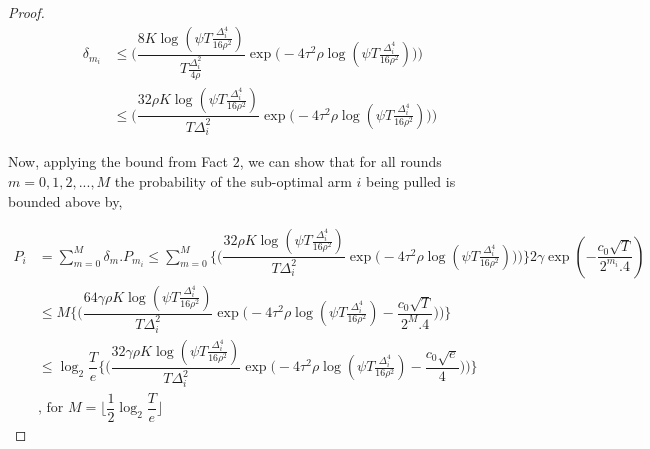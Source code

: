 \begin{proof}
\begin{align*}
\delta_{m_{i}}& \leq \bigg(\dfrac{8K\log (\psi T \frac{\Delta_{i}^{4}}{16\rho^{2}})}{T\frac{\Delta_{i}^{2}}{4\rho}}\exp\big(-4\tau^{2}\rho\log (\psi T\frac{\Delta_{i}^{4}}{16\rho^{2}})\big)\bigg)\\
&\leq \bigg(\dfrac{32\rho K\log (\psi T \frac{\Delta_{i}^{4}}{16\rho^{2}})}{T\Delta_{i}^{2}}\exp\big(-4\tau^{2}\rho\log (\psi T\frac{\Delta_{i}^{4}}{16\rho^{2}})\big)\bigg)
\end{align*}

%

Now, applying the bound from Fact $2$, we can show that for all rounds $m=0,1,2,...,M$ the probability of the sub-optimal arm $i$ being pulled is bounded above by,

\begin{align*}
P_{i} &= \sum_{m=0}^{M} \delta_{m}.P_{m_{i}} \leq \sum_{m=0}^{M} \bigg\lbrace \bigg(\dfrac{32\rho K\log (\psi T \frac{\Delta_{i}^{4}}{16\rho^{2}})}{T\Delta_{i}^{2}}\exp\big(-4\tau^{2}\rho\log (\psi T\frac{\Delta_{i}^{4}}{16\rho^{2}})\big)\bigg) \bigg\rbrace2\gamma \exp(-\dfrac{c_{0}\sqrt{T}}{2^{m_{i}}.4})\\
& \leq M \bigg\lbrace \bigg(\dfrac{64\gamma\rho K\log (\psi T \frac{\Delta_{i}^{4}}{16\rho^{2}})}{T\Delta_{i}^{2}}\exp\big(-4\tau^{2}\rho\log (\psi T\frac{\Delta_{i}^{4}}{16\rho^{2}})-\dfrac{c_{0}\sqrt{T}}{2^{M}.4}\big)\bigg) \bigg\rbrace \\
& \leq \log_{2}\dfrac{T}{e}\bigg\lbrace \bigg(\dfrac{32\gamma\rho K\log (\psi T \frac{\Delta_{i}^{4}}{16\rho^{2}})}{T\Delta_{i}^{2}}\exp\big(-4\tau^{2}\rho\log (\psi T\frac{\Delta_{i}^{4}}{16\rho^{2}})-\dfrac{c_{0}\sqrt{e}}{4}\big)\bigg) \bigg\rbrace\\
&\text{, for $M=\big \lfloor \dfrac{1}{2}\log_{2} \dfrac{T}{e}\big\rfloor$}
\end{align*}


\end{proof}
